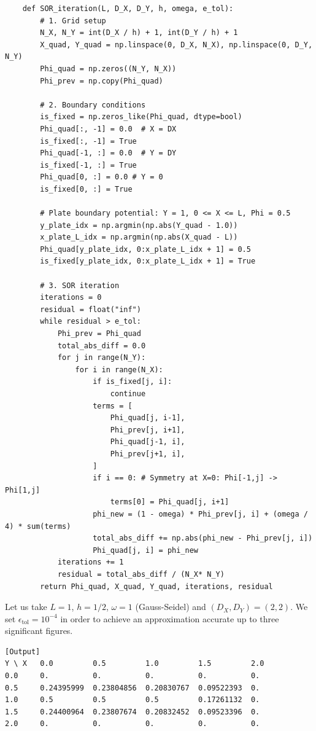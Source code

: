 \documentclass{article}
\begin{document}
\begin{verbatim}
    def SOR_iteration(L, D_X, D_Y, h, omega, e_tol):
        # 1. Grid setup
        N_X, N_Y = int(D_X / h) + 1, int(D_Y / h) + 1
        X_quad, Y_quad = np.linspace(0, D_X, N_X), np.linspace(0, D_Y, N_Y)
        Phi_quad = np.zeros((N_Y, N_X))
        Phi_prev = np.copy(Phi_quad)
    
        # 2. Boundary conditions
        is_fixed = np.zeros_like(Phi_quad, dtype=bool)
        Phi_quad[:, -1] = 0.0  # X = DX
        is_fixed[:, -1] = True
        Phi_quad[-1, :] = 0.0  # Y = DY
        is_fixed[-1, :] = True
        Phi_quad[0, :] = 0.0 # Y = 0
        is_fixed[0, :] = True
    
        # Plate boundary potential: Y = 1, 0 <= X <= L, Phi = 0.5
        y_plate_idx = np.argmin(np.abs(Y_quad - 1.0))
        x_plate_L_idx = np.argmin(np.abs(X_quad - L))
        Phi_quad[y_plate_idx, 0:x_plate_L_idx + 1] = 0.5
        is_fixed[y_plate_idx, 0:x_plate_L_idx + 1] = True
    
        # 3. SOR iteration
        iterations = 0
        residual = float("inf")
        while residual > e_tol:
            Phi_prev = Phi_quad
            total_abs_diff = 0.0
            for j in range(N_Y):
                for i in range(N_X):
                    if is_fixed[j, i]:
                        continue
                    terms = [
                        Phi_quad[j, i-1],
                        Phi_prev[j, i+1],
                        Phi_quad[j-1, i], 
                        Phi_prev[j+1, i],
                    ]
                    if i == 0: # Symmetry at X=0: Phi[-1,j] -> Phi[1,j]
                        terms[0] = Phi_quad[j, i+1]
                    phi_new = (1 - omega) * Phi_prev[j, i] + (omega / 4) * sum(terms)
                    total_abs_diff += np.abs(phi_new - Phi_prev[j, i])
                    Phi_quad[j, i] = phi_new
            iterations += 1
            residual = total_abs_diff / (N_X* N_Y)
        return Phi_quad, X_quad, Y_quad, iterations, residual
\end{verbatim}

Let us take \(L = 1\), \(h = 1/2\), \(\omega = 1\) (Gauss-Seidel) and \((D_X, D_Y) = (2, 2)\). We set \(\epsilon_{\mathrm{tol}} = 10^{-4}\) in order to achieve an approximation accurate up to three significant figures.

\begin{verbatim}[Output]
Y \ X   0.0         0.5         1.0         1.5         2.0
0.0     0.          0.          0.          0.          0.        
0.5     0.24395999  0.23804856  0.20830767  0.09522393  0.        
1.0     0.5         0.5         0.5         0.17261132  0.        
1.5     0.24400964  0.23807674  0.20832452  0.09523396  0.        
2.0     0.          0.          0.          0.          0.        
\end{verbatim}
\end{document}

